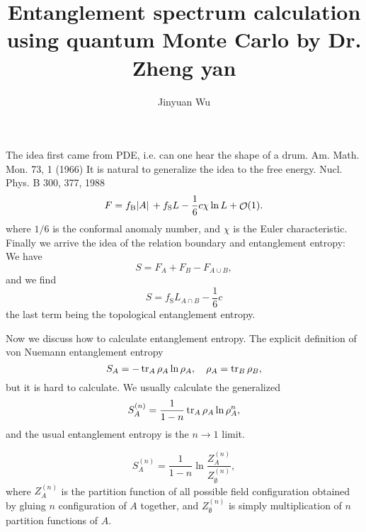 \documentclass[hyperref, a4paper]{article}
\title{Entanglement spectrum calculation using quantum Monte Carlo by Dr. Zheng yan}
\author{Jinyuan Wu}
\DeclareMathOperator{\bigO}{\mathcal{O}}
\begin{document}
\maketitle

The idea first came from PDE, i.e. can one hear the shape of a drum. Am. Math. Mon. 73, 1 (1966) 
It is natural to generalize the idea to the free energy. Nucl. Phys. B 300, 377, 1988
\begin{equation}
    F = f_\text{B} \abs*{A} + f_\text{S} L - \frac{1}{6} c \chi \ln L + \bigO(1).
\end{equation}
where $1/6$ is the conformal anomaly number, and $\chi$ is the Euler characteristic.
Finally we arrive the idea of the relation boundary and entanglement entropy: We have 
\begin{equation}
    S = F_A + F_B - F_{A \cup B},
\end{equation}
and we find 
\begin{equation}
    S = f_\text{S} L_{A \cap B} - \frac{1}{6} c 
\end{equation}
the last term being the topological entanglement entropy.

Now we discuss how to calculate entanglement entropy. The explicit definition of von Nuemann entanglement 
entropy 
\begin{equation}
    S_A = - \trace_A \rho_A \ln \rho_A, \quad \rho_A = \trace_B \rho_B,
\end{equation}
but it is hard to calculate. We usually calculate the generalized 
\begin{equation}
    S_A^{(n)} = \frac{1}{1 - n} \trace_A \rho_A \ln \rho_A^n,
\end{equation}
and the usual entanglement entropy is the $n \to 1$ limit.

\begin{equation}
    S_A^{(n)} = \frac{1}{1-n} \ln\frac{Z_A^{(n)}}{Z_\emptyset^{(n)}},
    \label{eq:s-n-partition}
\end{equation}
where $Z_A^{(n)}$ is the partition function of all possible field configuration obtained by gluing $n$ 
configuration of $A$ together, and $Z_\emptyset^{(n)}$ is simply multiplication of $n$ partition functions 
of $A$. 
\end{document}
